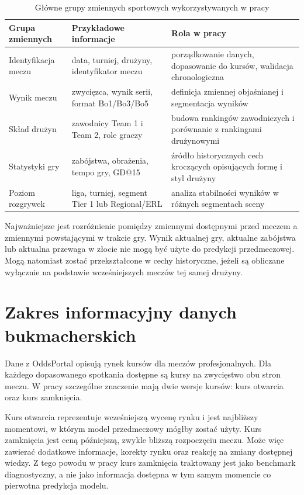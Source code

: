 \begin{table}[H]
    \centering
    \caption{Główne grupy zmiennych sportowych wykorzystywanych w pracy}
    \label{tab:sport_variable_groups}
    \small
    \begin{tabular}{p{3.8cm}p{4.6cm}p{5.0cm}}
        \toprule
        Grupa zmiennych & Przykładowe informacje & Rola w pracy \\
        \midrule
        Identyfikacja meczu & data, turniej, drużyny, identyfikator meczu & porządkowanie danych, dopasowanie do kursów, walidacja chronologiczna \\
        Wynik meczu & zwycięzca, wynik serii, format Bo1/Bo3/Bo5 & definicja zmiennej objaśnianej i segmentacja wyników \\
        Skład drużyn & zawodnicy Team 1 i Team 2, role graczy & budowa rankingów zawodniczych i porównanie z rankingami drużynowymi \\
        Statystyki gry & zabójstwa, obrażenia, tempo gry, GD@15 & źródło historycznych cech kroczących opisujących formę i styl drużyny \\
        Poziom rozgrywek & liga, turniej, segment Tier 1 lub Regional/ERL & analiza stabilności wyników w różnych segmentach sceny \\
        \bottomrule
    \end{tabular}
\end{table}

Najważniejsze jest rozróżnienie pomiędzy zmiennymi dostępnymi przed meczem a zmiennymi powstającymi w trakcie gry. Wynik aktualnej gry, aktualne zabójstwa lub aktualna przewaga w złocie nie mogą być użyte do predykcji przedmeczowej. Mogą natomiast zostać przekształcone w cechy historyczne, jeżeli są obliczane wyłącznie na podstawie wcześniejszych meczów tej samej drużyny.

\section{Zakres informacyjny danych bukmacherskich}

Dane z OddsPortal opisują rynek kursów dla meczów profesjonalnych. Dla każdego dopasowanego spotkania dostępne są kursy na zwycięstwo obu stron meczu. W pracy szczególne znaczenie mają dwie wersje kursów: kurs otwarcia oraz kurs zamknięcia.

Kurs otwarcia reprezentuje wcześniejszą wycenę rynku i jest najbliższy momentowi, w którym model przedmeczowy mógłby zostać użyty. Kurs zamknięcia jest ceną późniejszą, zwykle bliższą rozpoczęciu meczu. Może więc zawierać dodatkowe informacje, korekty rynku oraz reakcję na zmiany dostępnej wiedzy. Z tego powodu w pracy kurs zamknięcia traktowany jest jako benchmark diagnostyczny, a nie jako informacja dostępna w tym samym momencie co pierwotna predykcja modelu.

